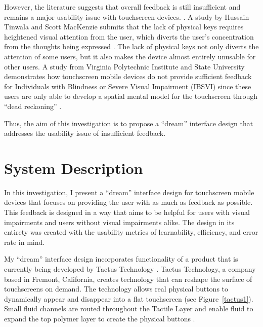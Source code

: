 \documentclass[11pt]{article}
\begin{document}
However, the literature suggests that overall feedback is still insufficient and remains a major usability issue with touchscreen devices. \cite{Tinwala:2010:ETE:18	68914.1868972, Kane:2011:UGB:1978942.1979001, Hardy:2008:TIT:1409240.1409267, El-Glaly:2013:TTF:2460625.2460665, Buxton:1986:HID:22339.22386}. A study by Hussain Tinwala and Scott MacKenzie submits that the lack of physical keys requires heightened visual attention from the user, which diverts the user's concentration from the thoughts being expressed \cite{Tinwala:2010:ETE:18 68914.1868972}. The lack of physical keys not only diverts the attention of some users, but it also makes the device  almost entirely unusable for other users. A study from Virginia Polytechnic Institute and State University demonstrates how touchscreen mobile devices do not provide sufficient feedback for Individuals with Blindness or Severe Visual Impairment (IBSVI) since these users are only able to develop a spatial mental model for the touchscreen through ``dead reckoning'' \cite{El-Glaly:2013:TTF:2460625.2460665}. 

Thus, the aim of this investigation is to propose a ``dream'' interface design that addresses the usability issue of insufficient feedback.


\section{System Description}
\label{System Description}

In this investigation, I present a ``dream'' interface design for touchscreen mobile devices that focuses on providing the user with as much as feedback as possible. This feedback is designed in a way that aims to be helpful for users with visual impairments and users without visual impairments alike. The design in its entirety was created with the usability metrics of learnability, efficiency, and error rate in mind.

My ``dream'' interface design incorporates functionality of a product that is currently being developed by Tactus Technology \cite{Tactus}. Tactus Technology, a company based in Fremont, California, creates technology that can reshape the surface of touchscreens on demand. The technology allows real physical buttons to dynamically appear and disappear into a flat touchscreen (see Figure~\ref{tactus1}). Small fluid channels are routed throughout the Tactile Layer and enable fluid to expand the top polymer layer to create the physical buttons \cite{Tactus}.
\end{document}

